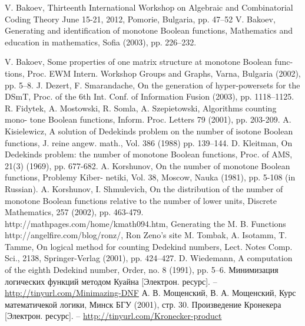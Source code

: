 

\begin{thebibliography}{9}
V. Bakoev, Thirteenth International Workshop on Algebraic and Combinatorial Coding Theory
June 15-21, 2012, Pomorie, Bulgaria, pp. 47--52
V. Bakoev, Generating and identification 
	of monotone Boolean functions, Mathematics 
	and education in mathematics, 
	Sofia (2003), pp. 226--232.
	
 V. Bakoev, Some properties of one matrix structure at monotone Boolean func-
tions, Proc. EWM Intern. Workshop Groups and Graphs, Varna, Bulgaria (2002),
pp. 5--8.
 J. Dezert, F. Smarandache, On the generation of hyper-powersets for the DSmT,
Proc. of the 6th Int. Conf. of Information Fusion (2003), pp. 1118--1125.
 R. Fidytek, A. Mostowski, R. Somla, A. Szepietowski, Algorithms counting mono-
tone Boolean functions, Inform. Proc. Letters 79 (2001), pp. 203-209.
 A. Kisielewicz, A solution of Dedekinds problem on the number of isotone Boolean
functions, J. reine angew. math., Vol. 386 (1988) pp. 139--144.
 D. Kleitman, On Dedekinds problem: the number of monotone Boolean functions,
Proc. of AMS, 21(3) (1969), pp. 677-682.
 A. Korshunov, On the number of monotone Boolean functions, Problemy Kiber-
netiki, Vol. 38, Moscow, Nauka (1981), pp. 5-108 (in Russian).
 A. Korshunov, I. Shmulevich, On the distribution of the number of monotone
Boolean functions relative to the number of lower units, Discrete Mathematics,
257 (2002), pp. 463-479.
 http://mathpages.com/home/kmath094.htm, Generating the M. B. Functions
 http://angelfire.com/blog/ronz/, Ron Zeno's site
 M. Tombak, A. Isotamm, T. Tamme, On logical method for counting Dedekind
numbers, Lect. Notes Comp. Sci., 2138, Springer-Verlag (2001), pp. 424--427.
 D. Wiedemann, A computation of the eighth Dedekind number, Order, no. 8
(1991), pp. 5--6.
 Минимизация логических функций методом Куайна [Электрон. ресурс]. -- 
  \underline{http://tinyurl.com/Minimazing-DNF}
 А. В. Мощенский, В. А. Мощенский, Курс математичекой логики, Минск БГУ (2001),
стр. 30.
 Произведение Кронекера [Электрон. ресурс]. -- 
  \underline{http://tinyurl.com/Kronecker-product}
\end{thebibliography}

